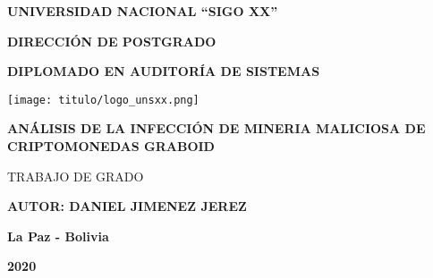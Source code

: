 \documentclass[../main/main.tex]{subfiles}
\begin{document}
  \thispagestyle{empty}
  \vspace*{-0.5cm}

  \begin{center}
    \LARGE\MakeUppercase{\textbf{Universidad Nacional ``Sigo XX''}}

    \vspace{0.5cm}
    \Large\MakeUppercase{\textbf{Dirección de Postgrado}}

    \vspace{0.5cm}
    \large\MakeUppercase{\textbf{Diplomado en Auditoría de Sistemas}}

    \vspace{1.3cm}
    \texttt{[image: titulo/logo\_unsxx.png]}
    \vspace{1.3cm}

    \Large\MakeUppercase{\textbf{Análisis de la infección de mineria maliciosa de criptomonedas Graboid}}

    \vspace{0.4cm}
    \large\MakeUppercase{Trabajo de Grado}

    \vspace{1cm}
    \large{\MakeUppercase{\textbf{Autor: Daniel Jimenez Jerez}}}
    \vspace{1cm}

    \large{\textbf{La Paz - Bolivia}}

    \large{\textbf{2020}}
  \end{center}
\end{document}
